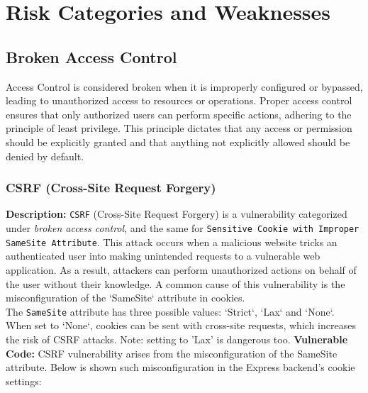 \documentclass[]{article}
\begin{document}
\newpage

\section{Risk Categories and Weaknesses}

\subsection{Broken Access Control}

Access Control is considered broken when it is improperly configured or bypassed, leading to unauthorized access to resources or operations. Proper access control ensures that only authorized users can perform specific actions, adhering to the principle of least privilege. This principle dictates that any access or permission should be explicitly granted and that anything not explicitly allowed should be denied by default.

\subsubsection{CSRF (Cross-Site Request Forgery)}
\label{subsubsec:csrf_with_samesite_none_misconfiguration}
\textbf{Description:}  
\texttt{CSRF} (Cross-Site Request Forgery) is a vulnerability categorized under \textit{broken access control}, and the same for \texttt{Sensitive Cookie with Improper SameSite Attribute}. This attack occurs when a malicious website tricks an authenticated user into making unintended requests to a vulnerable web application. As a result, attackers can perform unauthorized actions on behalf of the user without their knowledge. A common cause of this vulnerability is the misconfiguration of the `SameSite` attribute in cookies. \\ 
The \texttt{SameSite} attribute has three possible values: `Strict`, `Lax` and `None`. When set to `None`, cookies can be sent with cross-site requests, which increases the risk of CSRF attacks. Note: setting to 'Lax' is dangerous too. 
\textbf{Vulnerable Code:}
CSRF vulnerability arises from the misconfiguration of the SameSite attribute. Below is shown such misconfiguration in the Express backend's cookie settings:
\end{document}
